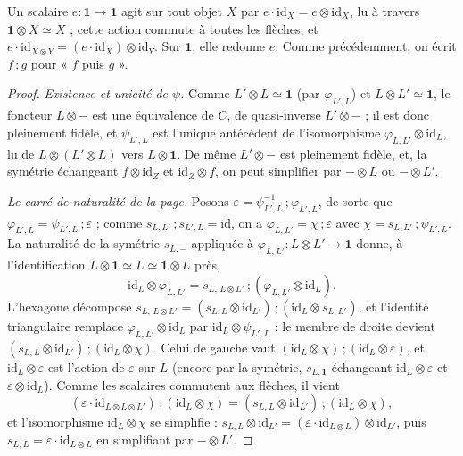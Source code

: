 Un scalaire $e : \mathbf 1 \to \mathbf 1$ agit sur tout objet $X$ par $e \cdot \mathrm{id}_X = e \otimes \mathrm{id}_X$, lu à travers $\mathbf 1 \otimes X \simeq X$ ; cette action commute à toutes les flèches, et $e \cdot \mathrm{id}_{X \otimes Y} = (e \cdot \mathrm{id}_X) \otimes \mathrm{id}_Y$. Sur $\mathbf 1$, elle redonne $e$. Comme précédemment, on écrit $f\,;g$ pour « $f$ puis $g$ ».

\begin{proof}
\emph{Existence et unicité de $\psi$.} Comme $L' \otimes L \simeq \mathbf 1$ (par $\varphi_{L',L}$) et $L \otimes L' \simeq \mathbf 1$, le foncteur $L \otimes -$ est une équivalence de $C$, de quasi-inverse $L' \otimes -$ ; il est donc pleinement fidèle, et $\psi_{L',L}$ est l'unique antécédent de l'isomorphisme $\varphi_{L,L'} \otimes \mathrm{id}_L$, lu de $L \otimes (L' \otimes L)$ vers $L \otimes \mathbf 1$. De même $L' \otimes -$ est pleinement fidèle, et, la symétrie échangeant $f \otimes \mathrm{id}_Z$ et $\mathrm{id}_Z \otimes f$, on peut simplifier par $- \otimes L$ ou $- \otimes L'$.

\emph{Le carré de naturalité de la page.} Posons $\varepsilon = \psi_{L',L}^{-1}\,;\varphi_{L',L}$, de sorte que $\varphi_{L',L} = \psi_{L',L}\,;\varepsilon$ ; comme $s_{L,L'}\,;s_{L',L} = \mathrm{id}$, on a $\varphi_{L,L'} = \chi\,;\varepsilon$ avec $\chi = s_{L,L'}\,;\psi_{L',L}$. La naturalité de la symétrie $s_{L,-}$ appliquée à $\varphi_{L,L'} : L \otimes L' \to \mathbf 1$ donne, à l'identification $L \otimes \mathbf 1 \simeq L \simeq \mathbf 1 \otimes L$ près,
\[
  \mathrm{id}_L \otimes \varphi_{L,L'} = s_{L,\, L \otimes L'}\,;(\varphi_{L,L'} \otimes \mathrm{id}_L).
\]
L'hexagone décompose $s_{L,\,L \otimes L'} = (s_{L,L} \otimes \mathrm{id}_{L'})\,;(\mathrm{id}_L \otimes s_{L,L'})$, et l'identité triangulaire remplace $\varphi_{L,L'} \otimes \mathrm{id}_L$ par $\mathrm{id}_L \otimes \psi_{L',L}$ : le membre de droite devient $(s_{L,L} \otimes \mathrm{id}_{L'})\,;(\mathrm{id}_L \otimes \chi)$. Celui de gauche vaut $(\mathrm{id}_L \otimes \chi)\,;(\mathrm{id}_L \otimes \varepsilon)$, et $\mathrm{id}_L \otimes \varepsilon$ est l'action de $\varepsilon$ sur $L$ (encore par la symétrie, $s_{L,\mathbf 1}$ échangeant $\mathrm{id}_L \otimes \varepsilon$ et $\varepsilon \otimes \mathrm{id}_L$). Comme les scalaires commutent aux flèches, il vient
\[
  (\varepsilon \cdot \mathrm{id}_{L \otimes L \otimes L'})\,;(\mathrm{id}_L \otimes \chi) = (s_{L,L} \otimes \mathrm{id}_{L'})\,;(\mathrm{id}_L \otimes \chi),
\]
et l'isomorphisme $\mathrm{id}_L \otimes \chi$ se simplifie : $s_{L,L} \otimes \mathrm{id}_{L'} = (\varepsilon \cdot \mathrm{id}_{L \otimes L}) \otimes \mathrm{id}_{L'}$, puis $s_{L,L} = \varepsilon \cdot \mathrm{id}_{L \otimes L}$ en simplifiant par $- \otimes L'$.


\end{proof}
